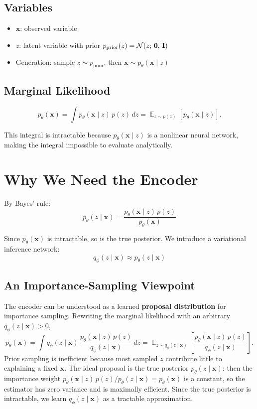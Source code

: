 \documentclass[11pt,a4paper]{article}
\DeclareMathOperator*{\E}{\mathbb{E}}
\newcommand{\bx}{\mathbf{x}} \newcommand{\by}{\mathbf{y}}
\newcommand{\pprior}{p_{\mathrm{prior}}}
\begin{document}
\subsection{Variables}

\begin{itemize}[leftmargin=1.2em, itemsep=2pt]
    \item $\bx$: observed variable
    \item $z$: latent variable with prior $\pprior(z) = \cN(z;\,\mathbf{0},\,\mathbf{I})$
    \item Generation: sample $z\sim\pprior$, then $\bx\sim p_\theta(\bx\mid z)$
\end{itemize}

\subsection{Marginal Likelihood}

\[
    p_\theta(\bx) = \int p_\theta(\bx\mid z)\,p(z)\,dz
    = \E_{z\sim p(z)}\!\left[p_\theta(\bx\mid z)\right].
\]

This integral is intractable because $p_\theta(\bx\mid z)$ is a nonlinear neural network, making the integral impossible to evaluate analytically.

\section{Why We Need the Encoder}\label{sec:encoder}

By Bayes' rule:
\[
    p_\theta(z\mid \bx) = \frac{p_\theta(\bx\mid z)\,p(z)}{p_\theta(\bx)}
\]

Since $p_\theta(\bx)$ is intractable, so is the true posterior. We introduce a variational inference network:
\[
    q_\phi(z\mid \bx)\approx p_\theta(z\mid \bx)
\]

\subsection{An Importance-Sampling Viewpoint}

The encoder can be understood as a learned \textbf{proposal distribution} for importance sampling. Rewriting the marginal likelihood with an arbitrary $q_\phi(z\mid \bx)>0$,
\[
    p_\theta(\bx)
    = \int q_\phi(z\mid \bx)\,\frac{p_\theta(\bx\mid z)\,p(z)}{q_\phi(z\mid \bx)}\,dz
    = \E_{z\sim q_\phi(z\mid \bx)}\!\left[\frac{p_\theta(\bx\mid z)\,p(z)}{q_\phi(z\mid \bx)}\right].
\]
Prior sampling is inefficient because most sampled $z$ contribute little to explaining a fixed $\bx$. The ideal proposal is the true posterior $p_\theta(z\mid \bx)$: then the importance weight $p_\theta(\bx\mid z)\,p(z)/p_\theta(z\mid \bx) = p_\theta(\bx)$ is a constant, so the estimator has zero variance and is maximally efficient. Since the true posterior is intractable, we learn $q_\phi(z\mid \bx)$ as a tractable approximation.
\end{document}
